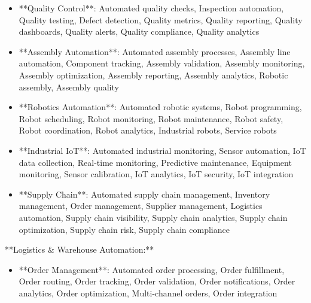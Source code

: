 \documentclass[11pt,a4paper]{article}
\begin{document}
\begin{itemize}
\item **Quality Control**: Automated quality checks, Inspection automation, Quality testing, Defect detection, Quality metrics, Quality reporting, Quality dashboards, Quality alerts, Quality compliance, Quality analytics
\end{itemize}

\begin{itemize}
\item **Assembly Automation**: Automated assembly processes, Assembly line automation, Component tracking, Assembly validation, Assembly monitoring, Assembly optimization, Assembly reporting, Assembly analytics, Robotic assembly, Assembly quality
\end{itemize}

\begin{itemize}
\item **Robotics Automation**: Automated robotic systems, Robot programming, Robot scheduling, Robot monitoring, Robot maintenance, Robot safety, Robot coordination, Robot analytics, Industrial robots, Service robots
\end{itemize}

\begin{itemize}
\item **Industrial IoT**: Automated industrial monitoring, Sensor automation, IoT data collection, Real-time monitoring, Predictive maintenance, Equipment monitoring, Sensor calibration, IoT analytics, IoT security, IoT integration
\end{itemize}

\begin{itemize}
\item **Supply Chain**: Automated supply chain management, Inventory management, Order management, Supplier management, Logistics automation, Supply chain visibility, Supply chain analytics, Supply chain optimization, Supply chain risk, Supply chain compliance
\end{itemize}

**Logistics \& Warehouse Automation:**

\begin{itemize}
\item **Order Management**: Automated order processing, Order fulfillment, Order routing, Order tracking, Order validation, Order notifications, Order analytics, Order optimization, Multi-channel orders, Order integration
\end{itemize}
\end{document}
